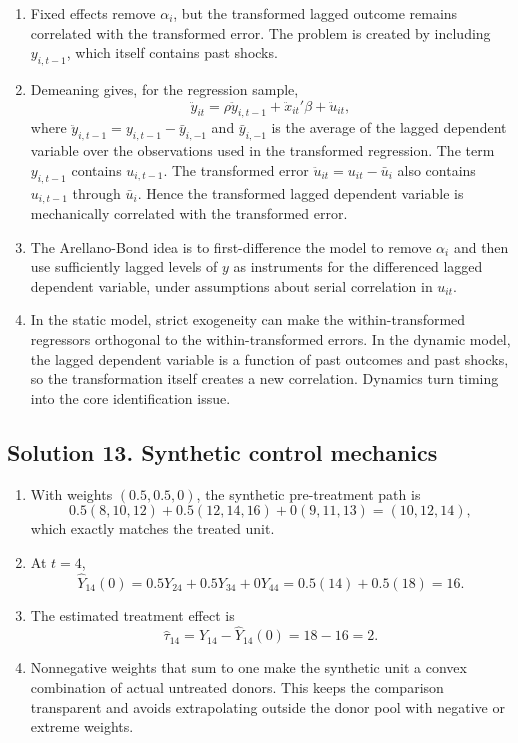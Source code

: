 \documentclass[11pt]{article}
\begin{document}
\begin{solutionbox}
\begin{enumerate}[label=(\alph*)]
\item Fixed effects remove $\alpha_i$, but the transformed lagged outcome remains correlated with the transformed error. The problem is created by including $y_{i,t-1}$, which itself contains past shocks.

\item Demeaning gives, for the regression sample,
\[
\ddot{y}_{it}=\rho \ddot{y}_{i,t-1}+\ddot{x}_{it}'\beta+\ddot{u}_{it},
\]
where $\ddot{y}_{i,t-1}=y_{i,t-1}-\bar{y}_{i,-1}$ and $\bar{y}_{i,-1}$ is the average of the lagged dependent variable over the observations used in the transformed regression. The term $y_{i,t-1}$ contains $u_{i,t-1}$. The transformed error $\ddot{u}_{it}=u_{it}-\bar{u}_i$ also contains $u_{i,t-1}$ through $\bar{u}_i$. Hence the transformed lagged dependent variable is mechanically correlated with the transformed error.

\item The Arellano-Bond idea is to first-difference the model to remove $\alpha_i$ and then use sufficiently lagged levels of $y$ as instruments for the differenced lagged dependent variable, under assumptions about serial correlation in $u_{it}$.

\item In the static model, strict exogeneity can make the within-transformed regressors orthogonal to the within-transformed errors. In the dynamic model, the lagged dependent variable is a function of past outcomes and past shocks, so the transformation itself creates a new correlation. Dynamics turn timing into the core identification issue.
\end{enumerate}
\end{solutionbox}

\subsection*{Solution 13. Synthetic control mechanics}

\begin{solutionbox}
\begin{enumerate}[label=(\alph*)]
\item With weights $(0.5,0.5,0)$, the synthetic pre-treatment path is
\[
0.5(8,10,12)+0.5(12,14,16)+0(9,11,13)=(10,12,14),
\]
which exactly matches the treated unit.

\item At $t=4$,
\[
\widehat{Y}_{14}(0)=0.5Y_{24}+0.5Y_{34}+0Y_{44}
=0.5(14)+0.5(18)=16.
\]

\item The estimated treatment effect is
\[
\hat{\tau}_{14}=Y_{14}-\widehat{Y}_{14}(0)=18-16=2.
\]

\item Nonnegative weights that sum to one make the synthetic unit a convex combination of actual untreated donors. This keeps the comparison transparent and avoids extrapolating outside the donor pool with negative or extreme weights.
\end{enumerate}
\end{solutionbox}
\end{document}

